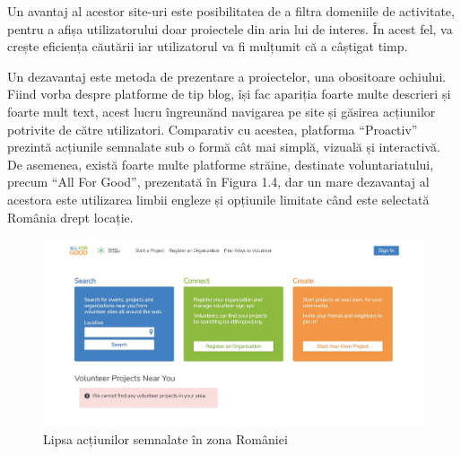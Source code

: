 \documentclass[12pt,a4paper]{report}
\begin{document}
\par
Un avantaj al acestor site-uri este posibilitatea de a filtra domeniile de activitate, pentru a afișa utilizatorului doar proiectele din aria lui de interes. În acest fel, va crește eficiența căutării iar utilizatorul va fi mulțumit că a câștigat timp.
\\\par 
Un dezavantaj este metoda de prezentare a proiectelor, una obositoare ochiului. Fiind vorba despre platforme de tip blog, își fac apariția foarte multe descrieri și foarte mult text, acest lucru îngreunănd navigarea pe site și găsirea acțiunilor potrivite de către utilizatori. Comparativ cu acestea, platforma “Proactiv” prezintă acțiunile semnalate sub o formă cât mai simplă, vizuală și interactivă.
\newpage
De asemenea, există foarte multe platforme străine, destinate voluntariatului, precum “All For Good”\cite{afg}, prezentată în Figura 1.4, dar un mare dezavantaj al acestora este utilizarea limbii engleze și opțiunile limitate când este selectată România drept locație.
\begin{figure}[H]
\centering
  \includegraphics[width=1\linewidth]{./imagini/afg.jpg}
  \caption{Lipsa acțiunilor semnalate în zona României}
\end{figure}
\end{document}
